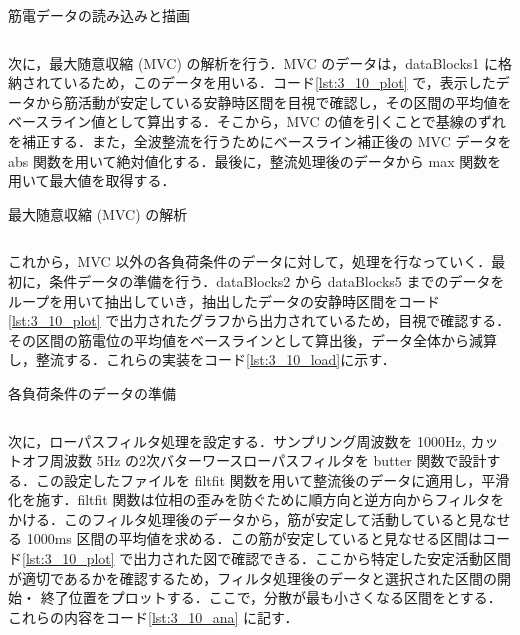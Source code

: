 \documentclass[dvipdfmx, titlepage, t]{jsarticle}
\begin{document}
    \begin{program}[H]
        \caption{筋電データの読み込みと描画}
        \inputminted[linenos,
        firstline=1,
        lastline=25,
        frame=lines,
        fontsize=\small]{matlab}{code/Exp3_10_Matlab.m}
        \label{lst:3_10_plot}
    \end{program}
    次に，最大随意収縮 (MVC) の解析を行う．MVC のデータは，dataBlocks{1} に格納されているため，このデータを用いる．コード\ref{lst:3_10_plot} で，表示したデータから筋活動が安定している安静時区間を目視で確認し，その区間の平均値をベースライン値として算出する．そこから，MVC の値を引くことで基線のずれを補正する．また，全波整流を行うためにベースライン補正後の MVC データを abs 関数を用いて絶対値化する．最後に，整流処理後のデータから max 関数を用いて最大値を取得する．
    \begin{program}
        \caption{最大随意収縮 (MVC) の解析}
        \inputminted[linenos,
        firstline=27,
        lastline=48,
        frame=lines,
        fontsize = \small]{matlab}{code/Exp3_10_Matlab.m}
        \label{lst:3_10_mvc}
    \end{program}

    これから，MVC 以外の各負荷条件のデータに対して，処理を行なっていく．最初に，条件データの準備を行う．dataBlocks{2} から dataBlocks{5} までのデータをループを用いて抽出していき，抽出したデータの安静時区間をコード\ref{lst:3_10_plot} で出力されたグラフから出力されているため，目視で確認する．その区間の筋電位の平均値をベースラインとして算出後，データ全体から減算し，整流する．これらの実装をコード\ref{lst:3_10_load}に示す．
    \begin{program}[H]
        \caption{各負荷条件のデータの準備}
        \inputminted[linenos,
        firstline=53,
        lastline=69,
        frame=lines,
        fontsize = \small]{matlab}{code/Exp3_10_Matlab.m}
        \label{lst:3_10_load}
    \end{program}

    次に，ローパスフィルタ処理を設定する．サンプリング周波数を 1000Hz, カットオフ周波数 5Hz の2次バターワースローパスフィルタを butter 関数で設計する．この設定したファイルを filtfit 関数を用いて整流後のデータに適用し，平滑化を施す．filtfit 関数は位相の歪みを防ぐために順方向と逆方向からフィルタをかける．このフィルタ処理後のデータから，筋が安定して活動していると見なせる 1000ms 区間の平均値を求める．この筋が安定していると見なせる区間はコード\ref{lst:3_10_plot} で出力された図で確認できる．ここから特定した安定活動区間が適切であるかを確認するため，フィルタ処理後のデータと選択された区間の開始・
    終了位置をプロットする．ここで，分散が最も小さくなる区間をとする．これらの内容をコード\ref{lst:3_10_ana} に記す．
\end{document}

